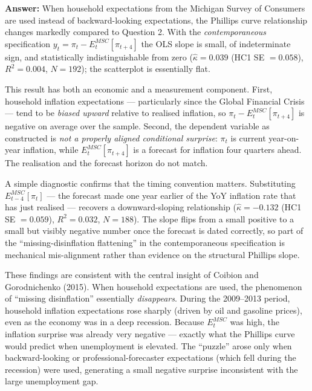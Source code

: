 \documentclass[
  12pt,
]{article}
\begin{document}
\textbf{Answer:} When household expectations from the Michigan Survey of
Consumers are used instead of backward-looking expectations, the
Phillips curve relationship changes markedly compared to Question 2.
With the \emph{contemporaneous} specification
\(y_t = \pi_t - E^{MSC}_t[\pi_{t+4}]\) the OLS slope is small, of
indeterminate sign, and statistically indistinguishable from zero
(\(\hat{\kappa} = 0.039\) (HC1 SE \(= 0.058\)), \(R^2 = 0.004\),
\(N = 192\)); the scatterplot is essentially flat.

This result has both an economic and a measurement component. First,
household inflation expectations --- particularly since the Global
Financial Crisis --- tend to be \emph{biased upward} relative to
realised inflation, so \(\pi_t - E^{MSC}_t[\pi_{t+4}]\) is negative on
average over the sample. Second, the dependent variable as constructed
is \emph{not a properly aligned conditional surprise}: \(\pi_t\) is
current year-on-year inflation, while \(E^{MSC}_t[\pi_{t+4}]\) is a
forecast for inflation four quarters ahead. The realisation and the
forecast horizon do not match.

A simple diagnostic confirms that the timing convention matters.
Substituting \(E^{MSC}_{t-4}[\pi_t]\) --- the forecast made one year
earlier of the YoY inflation rate that has just realised --- recovers a
downward-sloping relationship (\(\hat{\kappa} = -0.132\) (HC1 SE
\(= 0.059\)), \(R^2 = 0.032\), \(N = 188\)). The slope flips from a
small positive to a small but visibly negative number once the forecast
is dated correctly, so part of the ``missing-disinflation flattening''
in the contemporaneous specification is mechanical mis-alignment rather
than evidence on the structural Phillips slope.

These findings are consistent with the central insight of Coibion and
Gorodnichenko (2015). When household expectations are used, the
phenomenon of ``missing disinflation'' essentially \emph{disappears}.
During the 2009--2013 period, household inflation expectations rose
sharply (driven by oil and gasoline prices), even as the economy was in
a deep recession. Because \(E^{MSC}_t\) was high, the inflation surprise
was already very negative --- exactly what the Phillips curve would
predict when unemployment is elevated. The ``puzzle'' arose only when
backward-looking or professional-forecaster expectations (which fell
during the recession) were used, generating a small negative surprise
inconsistent with the large unemployment gap.

\newpage
\end{document}
